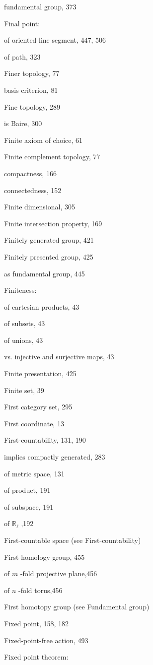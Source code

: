 fundamental group, 373

Final point:

of oriented line segment, 447, 506

of path, 323

Finer topology, 77

basis criterion, 81

Fine topology, 289

is Baire, 300

Finite axiom of choice, 61

Finite complement topology, 77

compactness, 166

connectedness, 152

Finite dimensional, 305

Finite intersection property, 169

Finitely generated group, 421

Finitely presented group, 425

as fundamental group, 445

Finiteness:

of cartesian products, 43

of subsets, 43

of unions, 43

vs. injective and surjective maps, 43

Finite presentation, 425

Finite set, 39

First category set, 295

First coordinate, 13

First-countability, 131, 190

implies compactly generated, 283

of metric space, 131

of product, 191

of subspace, 191

of \({\mathbb{R}}_{\ell }\) ,192

First-countable space (see First-countability)

First homology group, 455

of \(m\) -fold projective plane,456

of \(n\) -fold torus,456

First homotopy group (see Fundamental group)

Fixed point, 158, 182

Fixed-point-free action, 493

Fixed point theorem:

